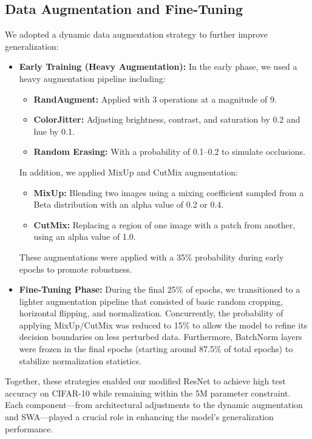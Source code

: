 \documentclass[letterpaper]{article}
\begin{document}
\subsection{Data Augmentation and Fine-Tuning}
We adopted a dynamic data augmentation strategy to further improve generalization:
\begin{itemize}
    \item \textbf{Early Training (Heavy Augmentation):} In the early phase, we used a heavy augmentation pipeline including:
        \begin{itemize}
            \item \textbf{RandAugment:} \cite{cubuk2020randaugment} Applied with 3 operations at a magnitude of 9.
            \item \textbf{ColorJitter:} Adjusting brightness, contrast, and saturation by 0.2 and hue by 0.1.
            \item \textbf{Random Erasing:} \cite{zhong2017random} With a probability of 0.1--0.2 to simulate occlusions.
        \end{itemize}
        In addition, we applied MixUp \cite{zhang2018mixup} and CutMix \cite{yun2019cutmix} augmentation:
        \begin{itemize}
            \item \textbf{MixUp:} Blending two images using a mixing coefficient sampled from a Beta distribution with an alpha value of 0.2 or 0.4.
            \item \textbf{CutMix:} Replacing a region of one image with a patch from another, using an alpha value of 1.0.
        \end{itemize}
        These augmentations were applied with a 35\% probability during early epochs to promote robustness.
    \item \textbf{Fine-Tuning Phase:} During the final 25\% of epochs, we transitioned to a lighter augmentation pipeline that consisted of basic random cropping, horizontal flipping, and normalization. Concurrently, the probability of applying MixUp/CutMix was reduced to 15\% to allow the model to refine its decision boundaries on less perturbed data. Furthermore, BatchNorm layers were frozen in the final epochs (starting around 87.5\% of total epochs) to stabilize normalization statistics.
\end{itemize}

Together, these strategies enabled our modified ResNet to achieve high test accuracy on CIFAR-10 while remaining within the 5M parameter constraint. Each component—from architectural adjustments to the dynamic augmentation and SWA—played a crucial role in enhancing the model's generalization performance.
\end{document}
